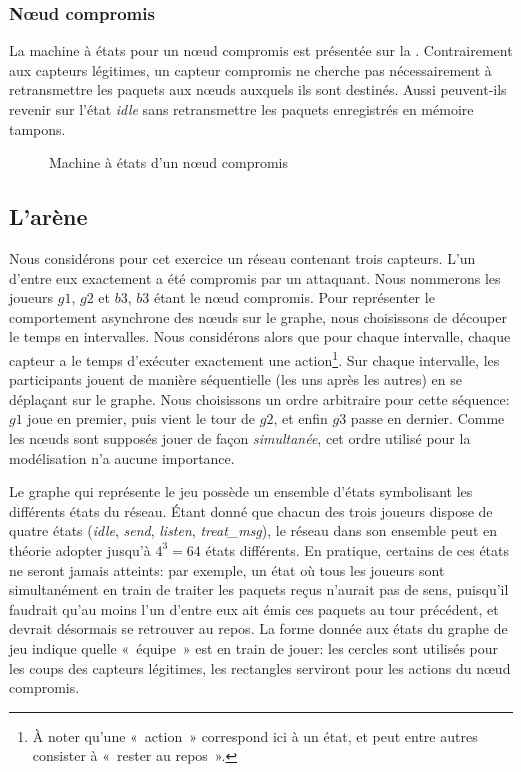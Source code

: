         \subsubsection{Nœud compromis}
La machine à états pour un nœud compromis est présentée sur la .
Contrairement aux capteurs légitimes, un capteur compromis ne cherche pas nécessairement à retransmettre les paquets aux nœuds auxquels ils sont destinés.
Aussi peuvent-ils revenir sur l'état \emph{idle} sans retransmettre les paquets enregistrés en mémoire tampons.
\begin{figure}[H]
    \centering
    
    \caption{Machine à états d'un nœud compromis}\label{tj:fig:autBadNode}
\end{figure}

\subsection{L'arène}
Nous considérons pour cet exercice un réseau contenant trois capteurs.
L'un d'entre eux exactement a été compromis par un attaquant.
Nous nommerons les joueurs $g1$, $g2$ et $b3$, $b3$ étant le nœud compromis.
Pour représenter le comportement asynchrone des nœuds sur le graphe, nous choisissons de découper le temps en intervalles.
Nous considérons alors que pour chaque intervalle, chaque capteur a le temps d'exécuter exactement une action\footnote{À noter qu'une « action » correspond ici à un état, et peut entre autres consister à « rester au repos ».}.
Sur chaque intervalle, les participants jouent de manière séquentielle (les uns après les autres) en se déplaçant sur le graphe.
Nous choisissons un ordre arbitraire pour cette séquence: $g1$ joue en premier, puis vient le tour de $g2$, et enfin $g3$ passe en dernier.
Comme les nœuds sont supposés jouer de façon \emph{simultanée}, cet ordre utilisé pour la modélisation n'a aucune importance.

Le graphe qui représente le jeu possède un ensemble d'états symbolisant les différents états du réseau.
Étant donné que chacun des trois joueurs dispose de quatre états (\emph{idle}, \emph{send}, \emph{listen}, \emph{treat\_msg}), le réseau dans son ensemble peut en théorie adopter jusqu'à $4^3=64$ états différents.
En pratique, certains de ces états ne seront jamais atteints: par exemple, un état où tous les joueurs sont simultanément en train de traiter les paquets reçus n'aurait pas de sens, puisqu'il faudrait qu'au moins l'un d'entre eux ait émis ces paquets au tour précédent, et devrait désormais se retrouver au repos.
La forme donnée aux états du graphe de jeu indique quelle « équipe » est en train de jouer: les cercles sont utilisés pour les coups des capteurs légitimes, les rectangles serviront pour les actions du nœud compromis.

